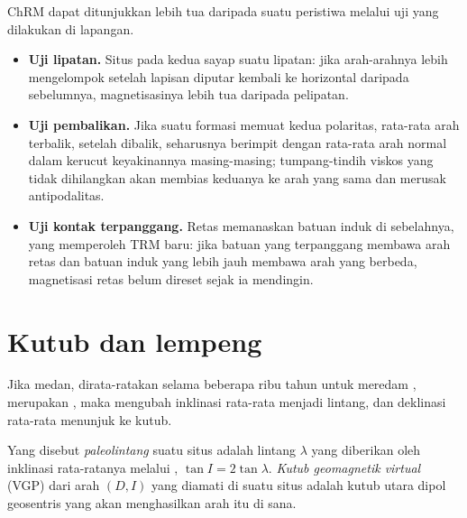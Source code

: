 \begin{method}\label{met:b3:palaeomagnetism:tests}
ChRM dapat ditunjukkan lebih tua daripada suatu peristiwa melalui uji yang dilakukan di lapangan.
\begin{itemize}
  \item \textbf{Uji lipatan.} Situs pada kedua sayap suatu lipatan: jika arah-arahnya
        lebih mengelompok setelah lapisan diputar kembali ke horizontal daripada
        sebelumnya, magnetisasinya lebih tua daripada pelipatan.
  \item \textbf{Uji pembalikan.} Jika suatu formasi memuat kedua polaritas, rata-rata
        arah terbalik, setelah dibalik, seharusnya berimpit dengan rata-rata
        arah normal dalam kerucut keyakinannya masing-masing; tumpang-tindih viskos yang tidak
        dihilangkan akan membias keduanya ke arah yang sama dan merusak antipodalitas.
  \item \textbf{Uji kontak terpanggang.} Retas memanaskan batuan induk di sebelahnya,
        yang memperoleh TRM baru: jika batuan yang terpanggang membawa arah retas dan
        batuan induk yang lebih jauh membawa arah yang berbeda, magnetisasi retas
        belum direset sejak ia mendingin.
\end{itemize}
\end{method}

\section{Kutub dan lempeng}

Jika medan, dirata-ratakan selama beberapa ribu tahun untuk meredam
, merupakan , maka  mengubah inklinasi rata-rata
menjadi lintang, dan deklinasi rata-rata menunjuk ke kutub.

\begin{definition}\label{def:b3:palaeomagnetism:vgp}
Yang disebut \emph{paleolintang} suatu situs adalah lintang
$\lambda$ yang diberikan oleh inklinasi rata-ratanya melalui , $\tan I =
2\tan\lambda$. \emph{Kutub geomagnetik virtual}
(VGP) dari arah $(D, I)$ yang diamati di suatu situs adalah kutub utara
dipol geosentris yang akan menghasilkan arah itu di sana.
\end{definition}

